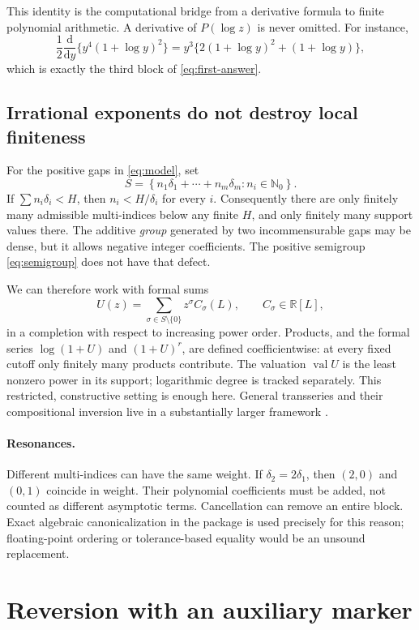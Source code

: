 \documentclass[11pt,a4paper]{article}
\numberwithin{equation}{section}
\theoremstyle{definition}
\theoremstyle{remark}
\newcommand{\R}{\mathbb R}
\newcommand{\N}{\mathbb N_0}
\newcommand{\dd}{\mathrm d}
\newcommand{\val}{\operatorname{val}}
\begin{document}
This identity is the computational bridge from a derivative formula to
finite polynomial arithmetic. A derivative of $P(\log z)$ is never omitted.
For instance,
\[
 \frac12\frac{\dd}{\dd y}\{y^4(1+\log y)^2\}
 =y^3\{2(1+\log y)^2+(1+\log y)\},
\]
which is exactly the third block of \eqref{eq:first-answer}.

\subsection{Irrational exponents do not destroy local finiteness}

For the positive gaps in \eqref{eq:model}, set
\begin{equation}
 S=\left\{n_1\delta_1+\cdots+n_m\delta_m:n_i\in\N\right\}.
 \label{eq:semigroup}
\end{equation}
If $\sum n_i\delta_i<H$, then $n_i<H/\delta_i$ for every $i$.
Consequently there are only finitely many admissible multi-indices below
any finite $H$, and only finitely many support values there.
The additive \emph{group} generated by two incommensurable gaps may be
dense, but it allows negative integer coefficients. The positive semigroup
\eqref{eq:semigroup} does not have that defect.

We can therefore work with formal sums
\[
 U(z)=\sum_{\sigma\in S\setminus\{0\}}z^\sigma C_\sigma(L),
 \qquad C_\sigma\in\R[L],
\]
in a completion with respect to increasing power order. Products, and the
formal series $\log(1+U)$ and $(1+U)^r$, are defined coefficientwise:
at every fixed cutoff only finitely many products contribute.
The valuation $\val U$ is the least nonzero power in its support;
logarithmic degree is tracked separately. This restricted, constructive
setting is enough here. General transseries and their compositional
inversion live in a substantially larger framework \cite{edgarbegin,edgarcomp}.

\paragraph{Resonances.}
Different multi-indices can have the same weight. If $\delta_2=2\delta_1$,
then $(2,0)$ and $(0,1)$ coincide in weight. Their polynomial coefficients
must be added, not counted as different asymptotic terms. Cancellation can
remove an entire block. Exact algebraic canonicalization in the package is
used precisely for this reason; floating-point ordering or tolerance-based
equality would be an unsound replacement.

\section{Reversion with an auxiliary marker}
\label{sec:marker}
\end{document}
